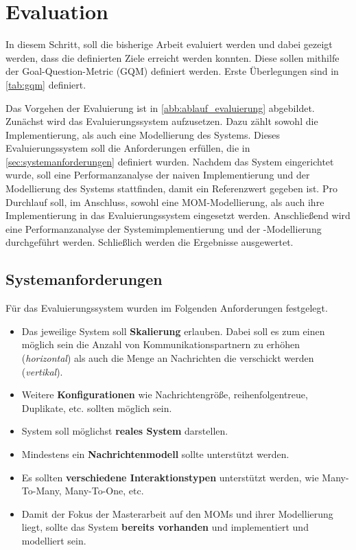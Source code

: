 
\chapter{Evaluation}
\label{ch:Evaluation}
In diesem Schritt, soll die bisherige Arbeit evaluiert werden und dabei gezeigt werden, dass die definierten Ziele erreicht werden konnten. Diese sollen mithilfe der Goal-Question-Metric (GQM) definiert werden. Erste Überlegungen sind in \autoref{tab:gqm} definiert.\par
Das Vorgehen der Evaluierung ist in \autoref{abb:ablauf_evaluierung} abgebildet. Zunächst wird das Evaluierungssystem aufzusetzen. Dazu zählt sowohl die Implementierung, als auch eine Modellierung des Systems. Dieses Evaluierungssystem soll die Anforderungen erfüllen, die in \autoref{sec:systemanforderungen} definiert wurden. Nachdem das System eingerichtet wurde, soll eine Performanzanalyse der naiven Implementierung und der Modellierung des Systems stattfinden, damit ein Referenzwert gegeben ist. Pro Durchlauf soll, im Anschluss, sowohl eine MOM-Modellierung, als auch ihre Implementierung in das Evaluierungssystem eingesetzt werden. Anschließend wird eine Performanzanalyse der Systemimplementierung und der -Modellierung durchgeführt werden. Schließlich werden die Ergebnisse ausgewertet.

\section{Systemanforderungen}
\label{sec:systemanforderungen}
Für das Evaluierungssystem wurden im Folgenden Anforderungen festgelegt.
\begin{itemize}
\item Das jeweilige System soll \textbf{Skalierung} erlauben. Dabei soll es zum einen möglich sein die Anzahl von Kommunikationspartnern zu erhöhen (\textit{horizontal}) als auch die Menge an Nachrichten die verschickt werden (\textit{vertikal}).
\item Weitere \textbf{Konfigurationen} wie Nachrichtengröße, reihenfolgentreue, Duplikate, etc. sollten möglich sein.
\item System soll möglichst \textbf{reales System} darstellen.
\item Mindestens ein \textbf{Nachrichtenmodell} sollte unterstützt werden.
\item Es sollten \textbf{verschiedene Interaktionstypen} unterstützt werden, wie Many-To-Many, Many-To-One, etc.
\item Damit der Fokus der Masterarbeit auf den MOMs und ihrer Modellierung liegt, sollte das System \textbf{bereits vorhanden} und implementiert und modelliert sein.
\end{itemize}

